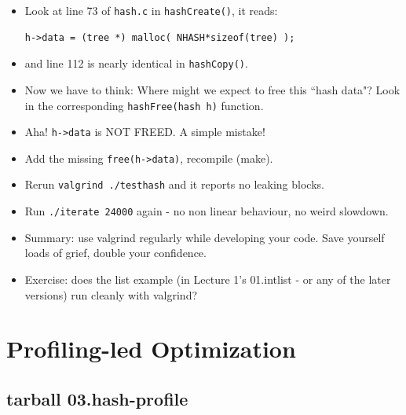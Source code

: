 \documentclass[aspectratio=169]{beamer}
\newcommand{\pitem}{\pause \item}
\begin{document}
\begin{frame}[fragile]
    \begin{itemize}
       \item
       Look at line 73 of \verb+hash.c+ in \verb+hashCreate()+, it reads:

\begin{verbatim}
h->data = (tree *) malloc( NHASH*sizeof(tree) );
\end{verbatim}
       \item and line 112 is nearly identical in \verb+hashCopy()+.

  \pitem
  Now we have to think: Where might we expect to free this ``hash data"?
  \pause
  Look in the corresponding \verb+hashFree(hash h)+ function.

  \pitem Aha!  \verb+h->data+ is NOT FREED.  A simple mistake!

  \item Add the missing \verb+free(h->data)+, recompile (make).
  \pitem Rerun \verb+valgrind ./testhash+ and it reports no leaking blocks.
  \item Run \verb+./iterate 24000+ again - no non linear behaviour,
  no weird slowdown.

    \pause
    \item
      Summary: \alert{use valgrind regularly while developing your code}.
      Save yourself loads of grief, double your confidence.
    \item
      Exercise: does the list example (in
      Lecture 1's \alert{01.intlist} - or any of the later versions)
      run cleanly with valgrind?
    \end{itemize}
\end{frame}

\section{Profiling-led Optimization}
\subsection{tarball 03.hash-profile}
\end{document}
